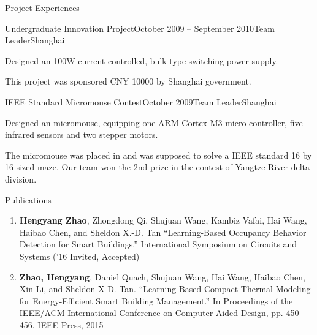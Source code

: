 \documentclass{resume} %
\begin{document}
\begin{rSection}{Project Experiences}
\begin{rSubsection}{Undergraduate Innovation Project}{October 2009 -- September 2010}{Team Leader}{Shanghai}
    \item Designed an 100W current-controlled, bulk-type switching power
        supply.

    \item This project was sponsored CNY 10000 by Shanghai government.

    \end{rSubsection}

    \begin{rSubsection}{IEEE Standard Micromouse Contest}{October 2009}{Team Leader}{Shanghai}

    \item Designed an micromouse, equipping one ARM Cortex-M3 micro controller,
        five infrared sensors and two stepper motors.

    \item The micromouse was placed in and was supposed to solve a IEEE
        standard 16 by 16 sized maze.  Our team won the 2nd prize in the
        contest of Yangtze River delta division.

    \end{rSubsection}

\end{rSection}


\begin{rSection}{Publications}

\begin{enumerate}

    \item \textbf{Hengyang Zhao}, Zhongdong Qi, Shujuan Wang, Kambiz Vafai, Hai
        Wang, Haibao Chen, and Sheldon X.-D. Tan ``Learning-Based Occupancy
        Behavior Detection for Smart Buildings.'' International Symposium on
        Circuits and Systems ('16 Invited, Accepted)

    \item \textbf{Zhao, Hengyang}, Daniel Quach, Shujuan Wang, Hai Wang, Haibao
        Chen, Xin Li, and Sheldon X-D. Tan. ``Learning Based Compact Thermal
        Modeling for Energy-Efficient Smart Building Management.'' In
        Proceedings of the IEEE/ACM International Conference on Computer-Aided
        Design, pp.  450-456. IEEE Press, 2015

\end{enumerate}

\end{rSection}
\end{document}
